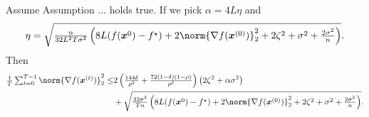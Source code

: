 \documentclass{article}
\begin{document}
\begin{theorem}
  Assume Assumption ... holds true.  If we pick $\alpha=4L\eta$ and
  \begin{align*}
    \eta = \sqrt{\tfrac{n}{32 L^2 T \sigma^2} \left( 8L(f(\xx^{0}) - f^\star) + 2\norm{\nabla f(\xx^{(0)}) }_2^2 + 2 \zeta^2 + \sigma^2 +\tfrac{2\sigma^2}{n} \right)}.
  \end{align*}
  Then
  \begin{align*}
    \tfrac{1}{T}\tsum_{t=0}^{T-1} \norm{\nabla f(\xx^{(t)})}_2^2
    \le & {2\left( \tfrac{144\delta}{\rho^2} +\tfrac{72(1-\delta)(1-\rho)}{\rho^2}\right) \left( 2  \zeta^2 + \alpha\sigma^2 \right)}                               \\
        & + \sqrt{\tfrac{32\sigma^2}{T n} \left( 8L(f(\xx^{0}) - f^\star) + 2\norm{\nabla f(\xx^{(0)}) }_2^2 + 2 \zeta^2 + \sigma^2 +\tfrac{2\sigma^2}{n} \right)}.
  \end{align*}
\end{theorem}
\end{document}
